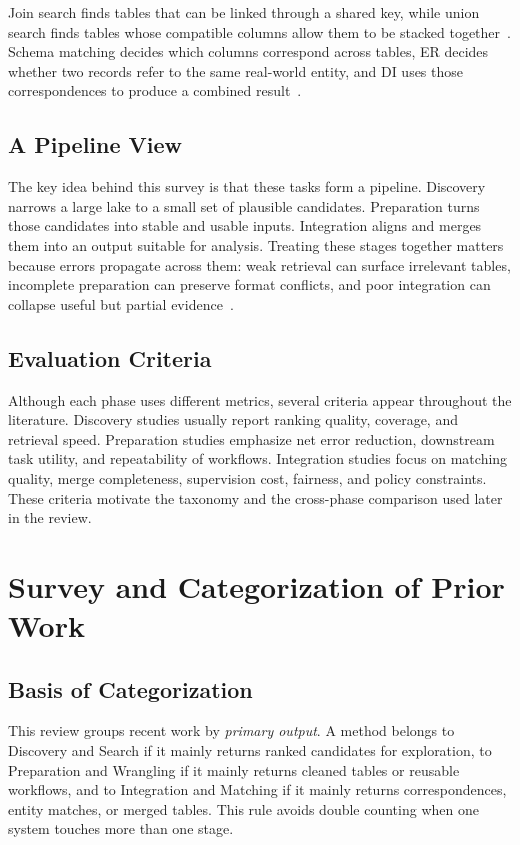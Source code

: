 \documentclass[sigconf]{acmart}
\begin{document}
Join search finds tables that can be linked through a shared key, while union search finds tables whose compatible columns allow them to be stacked together~\cite{10.14778/3659437.3659448,10.14778/3603581.3603587,10.1145/3588689}. Schema matching decides which columns correspond across tables, ER decides whether two records refer to the same real-world entity, and DI uses those correspondences to produce a combined result~\cite{10.14778/3742728.3742757,10.1145/3588722,10.1145/3588938}.

\subsection{A Pipeline View}
The key idea behind this survey is that these tasks form a pipeline. Discovery narrows a large lake to a small set of plausible candidates. Preparation turns those candidates into stable and usable inputs. Integration aligns and merges them into an output suitable for analysis. Treating these stages together matters because errors propagate across them: weak retrieval can surface irrelevant tables, incomplete preparation can preserve format conflicts, and poor integration can collapse useful but partial evidence~\cite{10.14778/3659437.3659461,10.14778/3675034.3675051,10.1145/3555041.3589732}.

\subsection{Evaluation Criteria}
Although each phase uses different metrics, several criteria appear throughout the literature. Discovery studies usually report ranking quality, coverage, and retrieval speed. Preparation studies emphasize net error reduction, downstream task utility, and repeatability of workflows. Integration studies focus on matching quality, merge completeness, supervision cost, fairness, and policy constraints. These criteria motivate the taxonomy and the cross-phase comparison used later in the review.

\section{Survey and Categorization of Prior Work}
\subsection{Basis of Categorization}
This review groups recent work by \emph{primary output}. A method belongs to Discovery and Search if it mainly returns ranked candidates for exploration, to Preparation and Wrangling if it mainly returns cleaned tables or reusable workflows, and to Integration and Matching if it mainly returns correspondences, entity matches, or merged tables. This rule avoids double counting when one system touches more than one stage.
\end{document}
